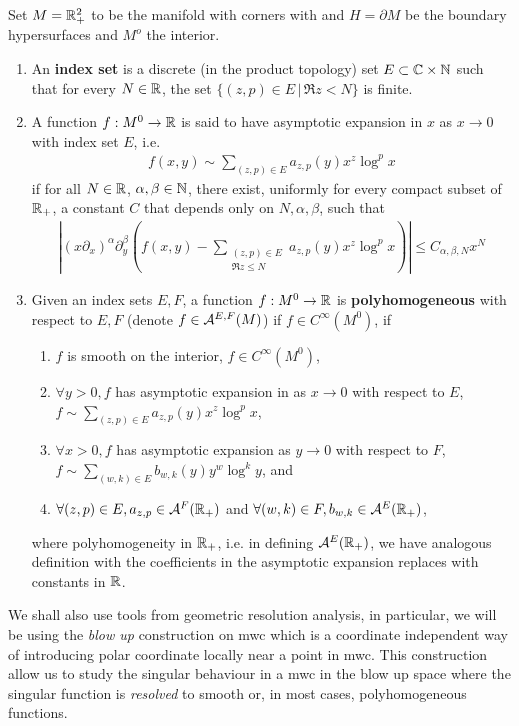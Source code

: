 \documentclass{article}
\begin{document}
\begin{definition} \cite{grieser_scales_blow_up}
Set $M = \mathbb R_+^2$ to be the manifold with corners with and $H = \partial M$ be the boundary hypersurfaces and $M^o$ the interior. 
\begin{enumerate}
\item An \textbf{index set} is a discrete (in the product topology) set $E \subset \mathbb C \times \mathbb N$ such that for every $N \in \mathbb R$, the set $\{(z, p) \in E \, |\, \Re z < N\}$ is finite. 
\item A function $f: M^0 \to \mathbb R$ is said to have asymptotic expansion in $x$ as $x \to 0$ with index set $E$, i.e. 
\begin{align*}
f(x, y) \sim \sum_{(z, p) \in E} a_{z, p}(y) x^z \log^p x
\end{align*}
if for all $N \in \mathbb R$, $\alpha, \beta \in \mathbb N$, there exist, uniformly for every compact subset of $\mathbb R_+$, a constant $C$ that depends only on $N, \alpha, \beta$, such that 
\begin{align*}
\left | (x\partial_x)^\alpha \partial_y^\beta \left( f(x, y) -  \sum_{\substack{(z, p) \in E \\ \Re z \leq N}} a_{z, p}(y) x^z \log^p x \right ) \right | \leq C_{\alpha, \beta, N} x^N
\end{align*}
\item Given an index sets $E, F$, a function $f: M^0 \to \mathbb R$ is \textbf{polyhomogeneous} with respect to $E, F$ (denote $f \in {\cal A}^{E, F}(M)$) if $f \in C^\infty(M^0)$, if 
\begin{enumerate}
\item $f$ is smooth on the interior, $f \in C^\infty(M^0)$, 
\item $\forall y > 0, f$ has asymptotic expansion in as $x \to 0$ with respect to $E$, $f \sim \sum_{(z, p) \in E} a_{z, p}(y) x^z \log^p x$, 
\item $\forall x > 0, f$ has asymptotic expansion as $y \to 0$ with respect to $F$, $f \sim \sum_{(w, k) \in E} b_{w, k}(y) y^w \log^k y$, and
\item $\forall (z, p) \in E, a_{z, p} \in {\cal A}^F(\mathbb R_+)$ and $\forall (w, k) \in F, b_{w, k} \in {\cal A}^E(\mathbb R_+)$,
\end{enumerate}
where polyhomogeneity in $\mathbb R_+$, i.e. in defining ${\cal A}^E(\mathbb R_+)$, we have analogous definition with the coefficients in the asymptotic expansion replaces with constants in $\mathbb R$. 
\end{enumerate}
\end{definition}
We shall also use tools from geometric resolution analysis, in particular, we will be using the \emph{blow up} construction on mwc which is a coordinate independent way of introducing polar coordinate locally near a point in mwc. This construction allow us to study the singular behaviour in a mwc in the blow up space where the singular function is \emph{resolved} to smooth or, in most cases, polyhomogeneous functions. 
\begin{definition} 

\end{definition}
\end{document}
